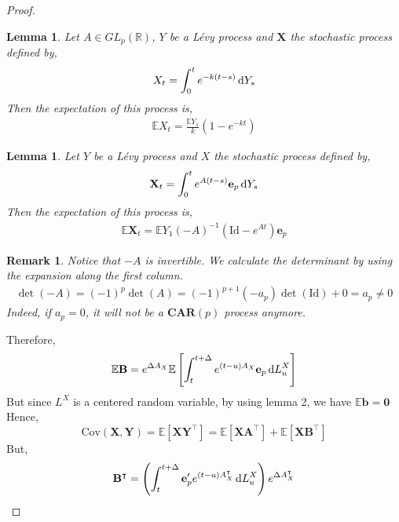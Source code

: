 \documentclass[10pt,a4paper,reqno]{amsart}
\newtheorem{lemma}[theorem]{Lemma}
\newtheorem{remark}[theorem]{Remark}
\theoremstyle{example}
\newcommand{\Cov}{\mathrm{Cov}}
\newcommand{\Id}{\mathrm{Id}}
\newcommand*\D{\mathop{}\!\textnormal{d}}
\begin{document}
\begin{proof}
$$$$
\begin{lemma}
    Let $A\in GL_p(\mathbb{R})$, $Y$ be a Lévy process and $\textbf{X}$ the stochastic process defined by,
    \begin{align}
        X_t=\int_0^t e^{-k(t-s)}\D Y_s\nonumber
    \end{align}
    Then the expectation of this process is,
    \begin{align}
        \mathbb{E}X_t=\frac{\mathbb{E}Y_1}{k} (1-e^{-kt})\nonumber
    \end{align}
\end{lemma}
\noindent
\begin{lemma}
    Let $Y$ be a Lévy process and $X$ the stochastic process defined by,
    \begin{align}
        \textbf{X}_t=\int_0^t e^{A(t-s)}\textbf{e}_p\D Y_s\nonumber
    \end{align}
    Then the expectation of this process is,
    \begin{align}
        \mathbb{E}\textbf{X}_t=\mathbb{E}Y_1(-A)^{-1}(\Id-e^{At})\textbf{e}_p
    \end{align}    
\end{lemma}
\noindent
\begin{remark}
    Notice that $-A$ is invertible. We calculate the determinant by using the expansion along the first column.
    \begin{align}
        \det(-A)=(-1)^p\det(A)=(-1)^{p+1}(-a_p)\det(\Id) + 0 =a_p \neq 0\nonumber
    \end{align}
    Indeed, if $a_p=0$, it will not be a $\textbf{CAR}(p)$ process anymore.
\end{remark}
\noindent
Therefore,
\newline
$$
\mathbb{E}\mathbf{B}=e^{\Delta A_X}\mathbb{E}\left[\int_t^{t+\Delta}e^{(t-u)A_X}\textbf{e}_p\D L_u^X\right]
$$
\newline
But since $L^X$ is a centered random variable, by using lemma 2, we have $\mathbb{E}\mathbf{b}=\textbf{0}$
\newline\newline
Hence,
\newline
$$
\Cov\left(\textbf{X},\textbf{Y}\right) = \mathbb{E}[\textbf{X}\textbf{Y}^\intercal]=\mathbb{E}[\textbf{X}\textbf{A}^\intercal] + \mathbb{E}[\textbf{X}\mathbf{B}^\intercal]
$$
\newline
But,
\newline
$$
\mathbf{B}^\intercal=\left(\int_t^{t+\Delta}\textbf{e}_p'e^{(t-u)A_X^\intercal}\D L_u^X\right)e^{\Delta A_X^\intercal}
$$
\end{proof}
\end{document}
